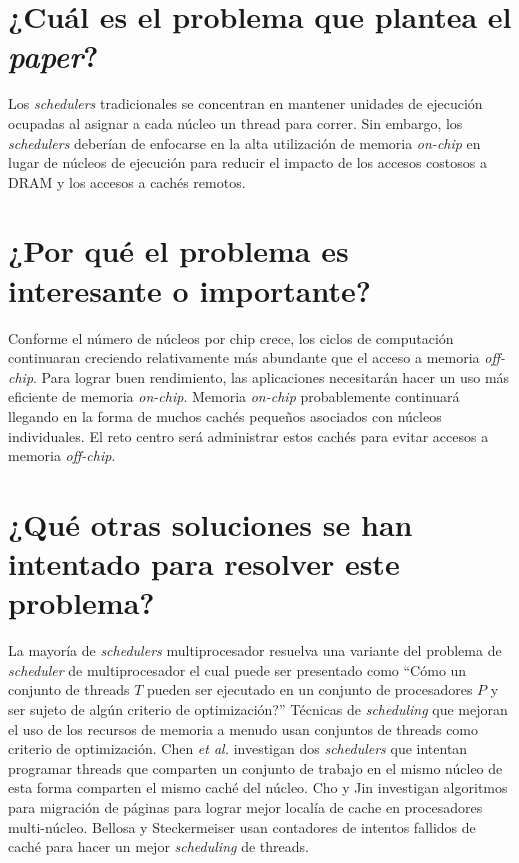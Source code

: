 \section{¿Cuál es el problema que plantea el \textit{paper}?}
Los \emph{schedulers} tradicionales se concentran en mantener unidades de ejecución ocupadas al asignar a cada núcleo un thread para correr. Sin embargo, los \emph{schedulers} deberían de enfocarse en la alta utilización de memoria \emph{on-chip} en lugar de núcleos de ejecución para reducir el impacto de los accesos costosos a DRAM y los accesos a cachés remotos.  

\section{¿Por qué el problema es interesante o importante?}
Conforme el número de núcleos por chip crece, los ciclos de computación continuaran creciendo relativamente más abundante que el acceso a memoria \emph{off-chip}. Para lograr buen rendimiento, las aplicaciones necesitarán hacer un uso más eficiente de memoria \emph{on-chip}. Memoria \emph{on-chip} probablemente continuará llegando en la forma de muchos cachés pequeños asociados con núcleos individuales. El reto centro será administrar estos cachés para evitar accesos a memoria \emph{off-chip}.

\section{¿Qué otras soluciones se han intentado para resolver este problema?}
La mayoría de \emph{schedulers} multiprocesador resuelva una variante del problema de \emph{scheduler} de multiprocesador el cual puede ser presentado como ``Cómo un conjunto de threads $T$ pueden ser ejecutado en un conjunto de procesadores $P$ y ser sujeto de algún criterio de optimización?'' Técnicas de \emph{scheduling} que mejoran el uso de los recursos de memoria a menudo usan conjuntos de threads como criterio de optimización. Chen \emph{et al.} investigan dos \emph{schedulers} que intentan programar threads que comparten un conjunto de trabajo en el mismo núcleo de esta forma comparten el mismo caché del núcleo. Cho y Jin investigan algoritmos para migración de páginas para lograr mejor localía de cache en procesadores multi-núcleo. Bellosa y Steckermeiser usan contadores de intentos fallidos de caché para hacer un mejor \emph{scheduling} de threads.
      
